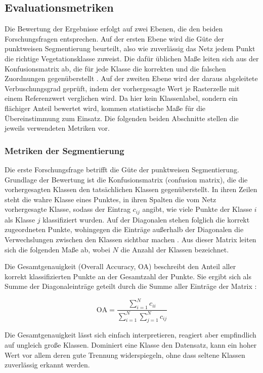 \subsection{Evaluationsmetriken}\label{evaluationsmetriken}

Die Bewertung der Ergebnisse erfolgt auf zwei Ebenen, die den beiden Forschungsfragen entsprechen. Auf der ersten Ebene wird die Güte der punktweisen Segmentierung beurteilt, also wie zuverlässig das Netz jedem Punkt die richtige Vegetationsklasse zuweist. Die dafür üblichen Maße leiten sich aus der Konfusionsmatrix ab, die für jede Klasse die korrekten und die falschen Zuordnungen gegenüberstellt \cite{Diab.2022}. Auf der zweiten Ebene wird der daraus abgeleitete Verbuschungsgrad geprüft, indem der vorhergesagte Wert je Rasterzelle mit einem Referenzwert verglichen wird. Da hier kein Klassenlabel, sondern ein flächiger Anteil bewertet wird, kommen statistische Maße für die Übereinstimmung zum Einsatz. Die folgenden beiden Abschnitte stellen die jeweils verwendeten Metriken vor.

\subsubsection{Metriken der Segmentierung}

Die erste Forschungsfrage betrifft die Güte der punktweisen Segmentierung. Grundlage der Bewertung ist die Konfusionsmatrix (confusion matrix), die die vorhergesagten Klassen den tatsächlichen Klassen gegenüberstellt. In ihren Zeilen steht die wahre Klasse eines Punktes, in ihren Spalten die vom Netz vorhergesagte Klasse, sodass der Eintrag $c_{ij}$ angibt, wie viele Punkte der Klasse $i$ als Klasse $j$ klassifiziert wurden. Auf der Diagonalen stehen folglich die korrekt zugeordneten Punkte, wohingegen die Einträge außerhalb der Diagonalen die Verwechslungen zwischen den Klassen sichtbar machen \cite{Diab.2022}. Aus dieser Matrix leiten sich die folgenden Maße ab, wobei $N$ die Anzahl der Klassen bezeichnet. 

Die Gesamtgenauigkeit (Overall Accuracy, OA) beschreibt den Anteil aller korrekt klassifizierten Punkte an der Gesamtzahl der Punkte. Sie ergibt sich als Summe der Diagonaleinträge geteilt durch die Summe aller Einträge der Matrix \cite{Diab.2022}:

\[
    \mathrm{OA} = \frac{\sum_{i=1}^{N} c_{ii}}{\sum_{i=1}^{N} \sum_{j=1}^{N} c_{ij}}
\]

Die Gesamtgenauigkeit lässt sich einfach interpretieren, reagiert aber empfindlich auf ungleich große Klassen. Dominiert eine Klasse den Datensatz, kann ein hoher Wert vor allem deren gute Trennung widerspiegeln, ohne dass seltene Klassen zuverlässig erkannt werden.

